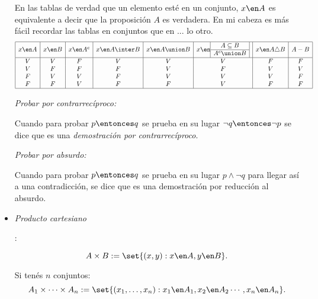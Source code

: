 \begin{itemize}[label={\tiny{}}]
        En las tablas de verdad que un elemento esté en un conjunto, $x \en A$ es equivalente a decir que la proposición $A$ es verdadera.
        En mi cabeza es más fácil recordar las tablas en conjuntos que en ... lo otro.
        \[
          \begin{array}{|c|c|c|c|c|c|c|c|}
            \hline
            x \en A & x \en B & x \en A^c & x \en A \inter B & x \en A \union B & x \en \subconjuntoYequivalente & x \en A \triangle B & A - B \\
            \hline
            V       & V       & F         & V                & V                & V                              & F                   & F     \\
            V       & F       & F         & F                & V                & F                              & V                   & V     \\
            F       & V       & V         & F                & V                & V                              & V                   & F     \\
            F       & F       & V         & F                & F                & V                              & F                   & F     \\
            \hline
          \end{array}
        \]

        \hypertarget{teoria-1:contrareciproco}{\textit{Probar por contrarrecíproco:}}
        Cuando para probar $p \entonces q$ se prueba en su lugar $\neg q \entonces \neg p$ se dice que es
        una \textit{demostración
          por contrarrecíproco}.\par

        \hypertarget{teoria-1:absurdo}{\textit{Probar por absurdo:}}
        Cuando para probar $p \entonces q$ se prueba en su lugar $p \land \neg q$ para llegar así
        a una contradicción, se dice que es una demostración por reducción al absurdo.

  \item \hypertarget{teoria-1:productoCartesiano}{\textit{Producto cartesiano}}:\par
        $$
          A \times B := \set{(x,y) : x\en A, y \en B}.
        $$

        Si tenés $n$ conjuntos:
        $$
          A_1 \times \cdots \times A_n := \set{(x_1,\dots,x_n): x_1 \en A_1, x_2 \en A_2 \cdots, x_n \en A_n}.
        $$


\end{itemize}
